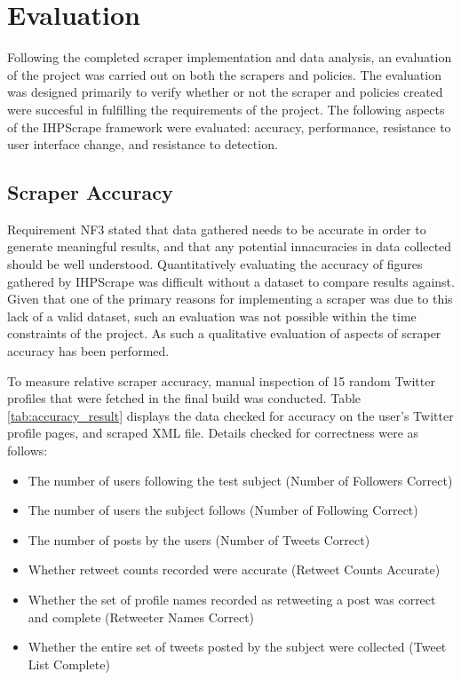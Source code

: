 \chapter{Evaluation}\label{C:us}

Following the completed scraper implementation and data analysis, an evaluation of the project was carried out on both the scrapers and policies. The evaluation was designed primarily to verify whether or not the scraper and policies created were succesful in fulfilling the requirements of the project. The following aspects of the IHPScrape framework were evaluated: accuracy, performance, resistance to user interface change, and  resistance to detection. 

\section{Scraper Accuracy}

Requirement NF3 stated that data gathered needs to be accurate in order to generate meaningful results, and that any potential innacuracies in data collected should be well understood. Quantitatively evaluating the accuracy of figures gathered by IHPScrape was difficult without a dataset to compare results against. Given that one of the primary reasons for implementing a scraper was due to this lack of a valid dataset, such an evaluation was not possible within the time constraints of the project. As such a qualitative evaluation of aspects of scraper accuracy has been performed.

To measure relative scraper accuracy, manual inspection of 15 random Twitter profiles that were fetched in the final build was conducted. Table \ref{tab:accuracy_result} displays the data checked for accuracy on the user's Twitter profile pages, and scraped XML file. Details checked for correctness were as follows:

\begin{itemize}
 \item The number of users following the test subject (Number of Followers Correct)
 \item The number of users the subject follows (Number of Following Correct)
 \item The number of posts by the users (Number of Tweets Correct)
 \item Whether retweet counts recorded were accurate (Retweet Counts Accurate)
 \item Whether the set of profile names recorded as retweeting a post was correct and complete (Retweeter Names Correct)
 \item Whether the entire set of tweets posted by the subject were collected (Tweet List Complete)
\end{itemize}

